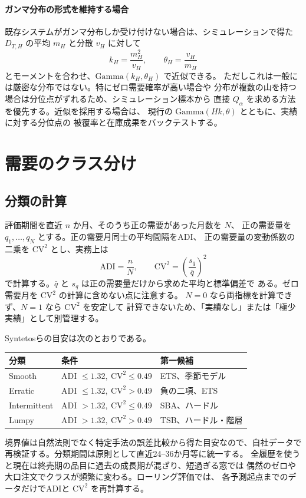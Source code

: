 \documentclass[a4paper,11pt]{jsarticle}
\begin{document}
\paragraph{ガンマ分布の形式を維持する場合}
既存システムがガンマ分布しか受け付けない場合は、シミュレーションで得た
$D_{T,H}$ の平均 $m_H$ と分散 $v_H$ に対して
\[
k_H=\frac{m_H^2}{v_H},\qquad
\theta_H=\frac{v_H}{m_H}
\]
とモーメントを合わせ、$\mathrm{Gamma}(k_H,\theta_H)$ で近似できる。
ただしこれは一般には厳密な分布ではない。特にゼロ需要確率が高い場合や
分布が複数の山を持つ場合は分位点がずれるため、シミュレーション標本から
直接 $Q_\alpha$ を求める方法を優先する。近似を採用する場合は、
現行の $\mathrm{Gamma}(Hk,\theta)$ とともに、実績に対する分位点の
被覆率と在庫成果をバックテストする。

\section{需要のクラス分け}

\subsection{分類の計算}

評価期間を直近 $n$ か月、そのうち正の需要があった月数を $N$、
正の需要量を $q_1,\ldots,q_N$ とする。正の需要月同士の平均間隔をADI、
正の需要量の変動係数の二乗を $\mathrm{CV}^2$ とし、実務上は
\[
\mathrm{ADI}=\frac{n}{N},\qquad
\mathrm{CV}^2=\left(\frac{s_q}{\bar q}\right)^2
\]
で計算する。$\bar q$ と $s_q$ は正の需要量だけから求めた平均と標準偏差で
ある。ゼロ需要月を $\mathrm{CV}^2$ の計算に含めない点に注意する。
$N=0$ なら両指標を計算できず、$N=1$ なら $\mathrm{CV}^2$ を安定して
計算できないため、「実績なし」または「極少実績」として別管理する。

Syntetosら\cite{syntetos2005category}の目安は次のとおりである。
\begin{center}\begin{tabular}{lll}\toprule
分類 & 条件 & 第一候補\\\midrule
Smooth & ADI $\le1.32,\ \mathrm{CV}^2\le0.49$ & ETS、季節モデル\\
Erratic & ADI $\le1.32,\ \mathrm{CV}^2>0.49$ & 負の二項、ETS\\
Intermittent & ADI $>1.32,\ \mathrm{CV}^2\le0.49$ & SBA、ハードル\\
Lumpy & ADI $>1.32,\ \mathrm{CV}^2>0.49$ & TSB、ハードル・階層\\\bottomrule
\end{tabular}\end{center}
境界値は自然法則でなく特定手法の誤差比較から得た目安なので、自社データで
再検証する。分類期間は原則として直近24--36か月等に統一する。
全履歴を使うと現在は終売期の品目に過去の成長期が混ざり、短過ぎる窓では
偶然のゼロや大口注文でクラスが頻繁に変わる。ローリング評価では、
各予測起点までのデータだけでADIと $\mathrm{CV}^2$ を再計算する。
\end{document}
